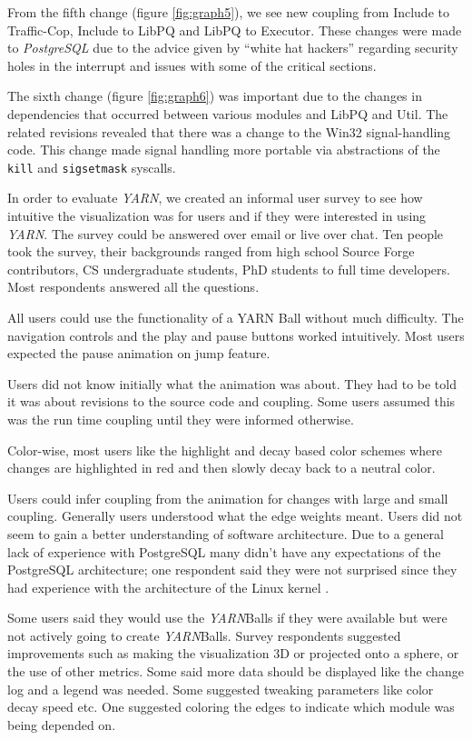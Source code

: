 \documentclass[times, 10pt,twocolumn]{article}
\newcommand{\yarn}{\emph{YARN\xspace}}
\newcommand{\postgresql}{\emph{PostgreSQL}\xspace}
\newcommand{\shtn}{\vspace*{-.5em}}
\begin{document}
From the fifth change (figure \ref{fig:graph5}), we see new coupling
from Include to Traffic-Cop, Include to LibPQ and LibPQ to Executor.
These changes were made to \postgresql due to the advice given by
``white hat hackers'' regarding security holes in the interrupt and
issues with some of the critical sections.

The sixth change (figure \ref{fig:graph6}) was important due to the
changes in dependencies that occurred between various modules and
LibPQ and Util.  The related revisions revealed that there was a
change to the Win32 signal-handling code. This change made signal
handling more portable via abstractions of the \texttt{kill} and
\texttt{sigsetmask} syscalls.

\shtn
{}
\shtn

In order to evaluate \yarn, we created an informal user survey to see
how intuitive the visualization was for users and if they were
interested in using \yarn.  The survey could be answered over email or
live over chat. Ten people took the survey, their backgrounds ranged
from high school Source Forge contributors, CS undergraduate students,
PhD students to full time developers. Most respondents answered all
the questions.

All users could use the functionality of a YARN Ball without much
difficulty. The navigation controls and the play and pause buttons
worked intuitively. Most users expected the pause animation on jump
feature.

Users did not know initially what the animation was about. They had to
be told it was about revisions to the source code and coupling. Some
users assumed this was the run time coupling until they were informed
otherwise.

Color-wise, most users like the highlight and decay based color schemes
where changes are highlighted in red and then slowly decay back to a
neutral color.

Users could infer coupling from the animation for changes with large
and small coupling. Generally users understood what the edge weights
meant.  Users did not seem to gain a better understanding of software
architecture. Due to a general lack of experience with PostgreSQL many
didn't have any expectations of the PostgreSQL architecture; one
respondent said they were not surprised since they had experience with
the architecture of the Linux kernel .

Some users said they would use the \yarn Balls if they were available
but were not actively going to create \yarn Balls.
Survey respondents suggested improvements such as making the
visualization 3D or projected onto a sphere, or the use of other
metrics.  Some said more data should be displayed like the change log
and a legend was needed.  Some suggested tweaking parameters like
color decay speed etc. One suggested coloring the edges to indicate
which module was being depended on.
\end{document}
